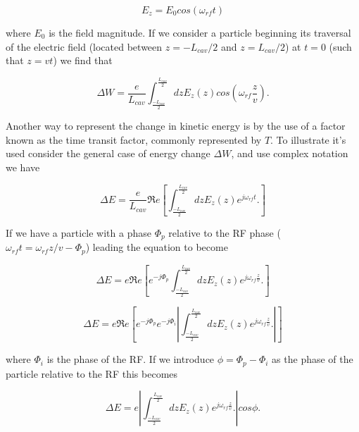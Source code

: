 \begin{equation}
E_{z} = E_{0} cos \left( \omega_{rf} t \right)
\end{equation}

where $E_{0}$ is the field magnitude. If we consider a particle beginning its traversal of the electric field (located between $z=-L_{cav}/2$ and $z=L_{cav}/2$) at $t=0$ (such that $z=vt$) we find that

\begin{equation}
\Delta W = \frac{e}{L_{cav}} \int^{\frac{L_{cav}}{2}}_{\frac{-L_{cav}}{2}} dz E_{z}\left( z \right) cos \left( \omega_{rf} \frac{z}{v} \right).
\end{equation}

Another way to represent the change in kinetic energy is by the use of a factor known as the time transit factor, commonly represented by $T$. To illustrate it's used consider the general case of energy change $\Delta W$, and use complex notation we have

\begin{equation}
\Delta E = \frac{e}{L_{cav}} \Re{}e \left[ \int^{\frac{L_{cav}}{2}}_{\frac{-L_{cav}}{2}} dz E_{z}\left( z \right)e^{j \omega_{rf} t}.\right]
\end{equation}

If we have a particle with a phase $\Phi_{p}$ relative to the RF phase ($\omega_{rf}t = \omega_{rf}z/v - \Phi_{p}$) leading the equation to become

\begin{equation}
\Delta E = e \Re{}e \left[ e^{-j \Phi_{p}}\int^{\frac{L_{cav}}{2}}_{\frac{-L_{cav}}{2}} dz E_{z}\left( z \right) e^{j \omega_{rf} \frac{z}{v}}.\right]
\end{equation}

\begin{equation}
\Delta E = e \Re{}e \left[ e^{-j \Phi_{p}} e^{-j \Phi_{i}} \left| \int^{\frac{L_{cav}}{2}}_{\frac{-L_{cav}}{2}} dz E_{z}\left( z \right) e^{j \omega_{rf} \frac{z}{v}}.\right| \right]
\end{equation}

where $\Phi_{i}$ is the phase of the RF. If we introduce $\phi = \Phi_{p} - \Phi_{i}$ as the phase of the particle relative to the RF this becomes

\begin{equation}
\Delta E = e  \left| \int^{\frac{L_{cav}}{2}}_{\frac{-L_{cav}}{2}} dz E_{z}\left( z \right) e^{j \omega_{rf} \frac{z}{v}}.\right| cos \phi.
\end{equation}

